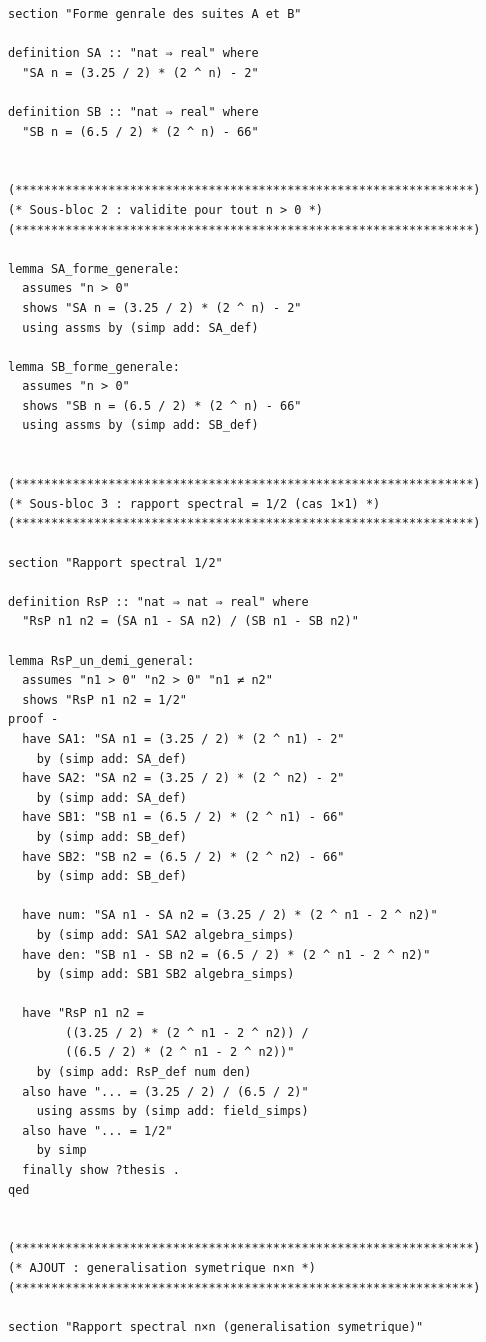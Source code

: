 \documentclass[a4paper,11pt]{article}
\begin{document}
\begin{holcode}[title={\textcolor{white}{File: methode\_spectral.thy -- Part 1/4}}]
\begin{lstlisting}
section "Forme genrale des suites A et B"

definition SA :: "nat ⇒ real" where
  "SA n = (3.25 / 2) * (2 ^ n) - 2"

definition SB :: "nat ⇒ real" where
  "SB n = (6.5 / 2) * (2 ^ n) - 66"


(****************************************************************)
(* Sous-bloc 2 : validite pour tout n > 0 *)
(****************************************************************)

lemma SA_forme_generale:
  assumes "n > 0"
  shows "SA n = (3.25 / 2) * (2 ^ n) - 2"
  using assms by (simp add: SA_def)

lemma SB_forme_generale:
  assumes "n > 0"
  shows "SB n = (6.5 / 2) * (2 ^ n) - 66"
  using assms by (simp add: SB_def)


(****************************************************************)
(* Sous-bloc 3 : rapport spectral = 1/2 (cas 1×1) *)
(****************************************************************)

section "Rapport spectral 1/2"

definition RsP :: "nat ⇒ nat ⇒ real" where
  "RsP n1 n2 = (SA n1 - SA n2) / (SB n1 - SB n2)"

lemma RsP_un_demi_general:
  assumes "n1 > 0" "n2 > 0" "n1 ≠ n2"
  shows "RsP n1 n2 = 1/2"
proof -
  have SA1: "SA n1 = (3.25 / 2) * (2 ^ n1) - 2"
    by (simp add: SA_def)
  have SA2: "SA n2 = (3.25 / 2) * (2 ^ n2) - 2"
    by (simp add: SA_def)
  have SB1: "SB n1 = (6.5 / 2) * (2 ^ n1) - 66"
    by (simp add: SB_def)
  have SB2: "SB n2 = (6.5 / 2) * (2 ^ n2) - 66"
    by (simp add: SB_def)

  have num: "SA n1 - SA n2 = (3.25 / 2) * (2 ^ n1 - 2 ^ n2)"
    by (simp add: SA1 SA2 algebra_simps)
  have den: "SB n1 - SB n2 = (6.5 / 2) * (2 ^ n1 - 2 ^ n2)"
    by (simp add: SB1 SB2 algebra_simps)

  have "RsP n1 n2 =
        ((3.25 / 2) * (2 ^ n1 - 2 ^ n2)) /
        ((6.5 / 2) * (2 ^ n1 - 2 ^ n2))"
    by (simp add: RsP_def num den)
  also have "... = (3.25 / 2) / (6.5 / 2)"
    using assms by (simp add: field_simps)
  also have "... = 1/2"
    by simp
  finally show ?thesis .
qed


(****************************************************************)
(* AJOUT : generalisation symetrique n×n *)
(****************************************************************)

section "Rapport spectral n×n (generalisation symetrique)"


\end{lstlisting}
\end{holcode}
\end{document}

